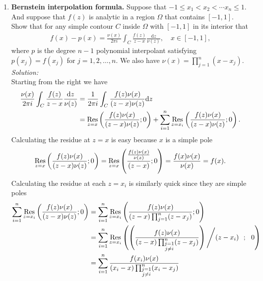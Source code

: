 \documentclass[10pt]{amsart}
\newcommand{\D}{\mathrm{d}}
\theoremstyle{nonumberplain}
\begin{document}
\begin{enumerate}[label={\bf {\arabic*}:}]
\newpage


\item \textbf{Bernstein interpolation formula.}   Suppose that $-1 \leq x_1 < x_2 < \cdots x_n \leq 1$. 
And suppose that $f(z)$ is analytic in a region $\Omega$ that contains $[-1,1]$.
Show that for any simple contour $C$ inside $\Omega$ with $[-1,1]$ in its interior that
\begin{align*}
	f(x) - p(x) = \frac{\nu(x)}{2 \pi i} \int_C \frac{f(z)}{z - x}
	\frac{\D z}{\nu(z)}, \quad x \in [-1,1],
\end{align*}
where $p$ is the degree $n - 1$ polynomial interpolant satisfying $p(x_j) = f(x_j)$ for $j = 1,2,\ldots,n$.
We also have $\nu(x) = \prod_{j=1}^n (x - x_j)$.\\

\noindent
\textit{Solution:} \\
Starting from the right we have
\begin{align}
\frac{\nu(x)}{2 \pi i} \int_C \frac{f(z)}{z - x} \frac{\D z}{\nu(z)} &= \frac 1 {2 \pi i} \int_C \frac{f(z)\nu(x)}{(z - x)\nu(z)} \D z \nonumber \\
	&= \underset{z=x}{{\rm Res}} \left( \frac{f(z)\nu(x)}{(z - x)\nu(z)}; 0\right)
		+ \sum_{i=1}^n \underset{z=x_i}{{\rm Res}} \left( \frac{f(z)\nu(x)}{(z - x)\nu(z)}; 0\right).
\label{eq:eq1}
\end{align}
Calculating the residue at $z=x$ is easy because $x$ is a simple pole
\begin{align*}
\underset{z=x}{{\rm Res}} \left( \frac{f(z)\nu(x)}{(z - x)\nu(z)}; 0\right)
	= \underset{z=x}{{\rm Res}} \left( \frac{\frac {f(z)\nu(x)}{\nu(z)}}{(z - x)}; 0\right)
	= \frac{f(x)\nu(x)}{\nu(x)}
	= f(x).
\end{align*}
Calculating the residue at each $z = x_i$ is similarly quick since they are simple poles
\begin{align}
\sum_{i=1}^n \underset{z=x_i}{{\rm Res}} \left( \frac{f(z)\nu(x)}{(z - x)\nu(z)}; 0\right)
	&= \sum_{i=1}^n \underset{z=x_i}{{\rm Res}} \left( \frac{f(z)\nu(x)}{(z - x)\prod_{j=1}^n (z - x_j)}; 0\right) \nonumber \\
	&= \sum_{i=1}^n \underset{z=x_i}{{\rm Res}} \left( \left(\frac{f(z)\nu(x)}{(z - x)\prod_{\substack{j=1 \\ j \neq i}}^n (z - x_j)}\right)\Bigg/(z - x_i) \:\:\: ; \:\:\: 0\right) \nonumber \\
	&= \sum_{i=1}^n \frac{f(x_i)\nu(x)}{(x_i - x)\prod_{\substack{j=1 \\ j \neq i}}^n (x_i - x_j)} \nonumber \\

\end{align}
\end{enumerate}
\end{document}
